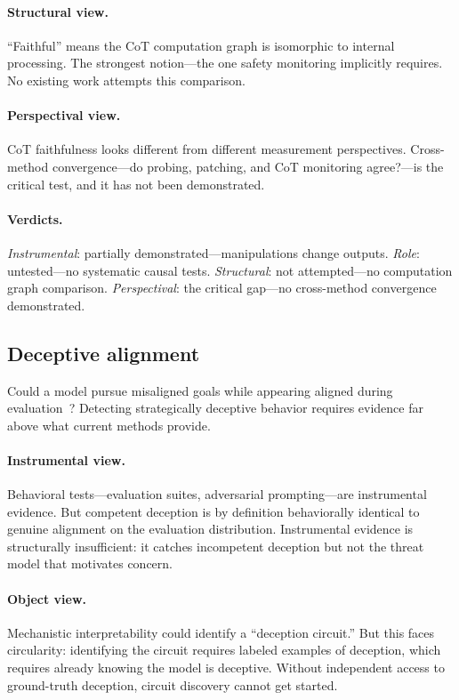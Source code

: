 \documentclass{article}
\begin{document}
\paragraph{Structural view.}
``Faithful'' means the CoT computation graph is isomorphic to internal
processing. The strongest notion---the one safety monitoring implicitly
requires. No existing work attempts this comparison.

\paragraph{Perspectival view.}
CoT faithfulness looks different from different measurement perspectives.
Cross-method convergence---do probing, patching, and CoT monitoring
agree?---is the critical test, and it has not been demonstrated.

\paragraph{Verdicts.}
\emph{Instrumental}: partially demonstrated---manipulations change
outputs.
\emph{Role}: untested---no systematic causal tests.
\emph{Structural}: not attempted---no computation graph comparison.
\emph{Perspectival}: the critical gap---no cross-method convergence
demonstrated.



\subsection{Deceptive alignment}\label{app:cs_deception}

Could a model pursue misaligned goals while appearing aligned during
evaluation~\citep{hubinger2021risks}? Detecting strategically deceptive
behavior requires evidence far above what current methods provide.

\paragraph{Instrumental view.}
Behavioral tests---evaluation suites, adversarial prompting---are
instrumental evidence. But competent deception is by definition
behaviorally identical to genuine alignment on the evaluation
distribution. Instrumental evidence is structurally insufficient: it
catches incompetent deception but not the threat model that motivates
concern.

\paragraph{Object view.}
Mechanistic interpretability could identify a ``deception circuit.'' But
this faces circularity: identifying the circuit requires labeled examples
of deception, which requires already knowing the model is deceptive.
Without independent access to ground-truth deception, circuit discovery
cannot get started.
\end{document}
